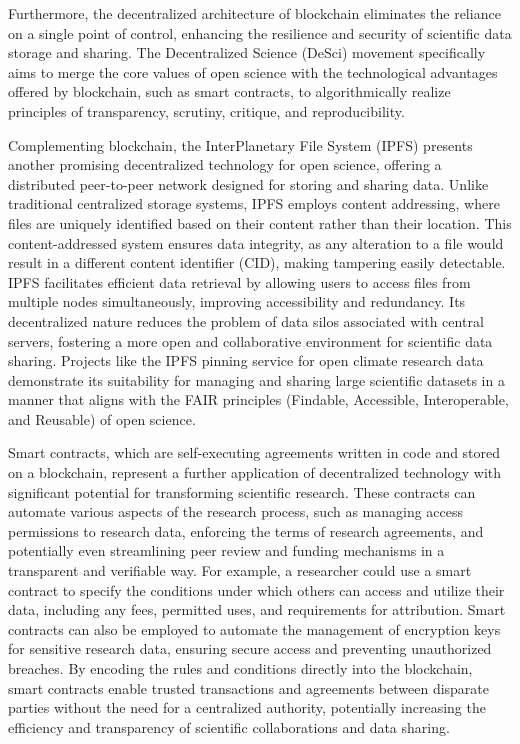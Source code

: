 \documentclass{article}
\begin{document}
Furthermore, the decentralized architecture of blockchain eliminates the reliance on a single point of control, enhancing the resilience and security of scientific data storage and sharing. The Decentralized Science (DeSci) movement specifically aims to merge the core values of open science with the technological advantages offered by blockchain, such as smart contracts, to algorithmically realize principles of transparency, scrutiny, critique, and reproducibility.

Complementing blockchain, the InterPlanetary File System (IPFS) presents another promising decentralized technology for open science, offering a distributed peer-to-peer network designed for storing and sharing data. Unlike traditional centralized storage systems, IPFS employs content addressing, where files are uniquely identified based on their content rather than their location. This content-addressed system ensures data integrity, as any alteration to a file would result in a different content identifier (CID), making tampering easily detectable. IPFS facilitates efficient data retrieval by allowing users to access files from multiple nodes simultaneously, improving accessibility and redundancy. Its decentralized nature reduces the problem of data silos associated with central servers, fostering a more open and collaborative environment for scientific data sharing. Projects like the IPFS pinning service for open climate research data demonstrate its suitability for managing and sharing large scientific datasets in a manner that aligns with the FAIR principles (Findable, Accessible, Interoperable, and Reusable) of open science.

Smart contracts, which are self-executing agreements written in code and stored on a blockchain, represent a further application of decentralized technology with significant potential for transforming scientific research. These contracts can automate various aspects of the research process, such as managing access permissions to research data, enforcing the terms of research agreements, and potentially even streamlining peer review and funding mechanisms in a transparent and verifiable way. For example, a researcher could use a smart contract to specify the conditions under which others can access and utilize their data, including any fees, permitted uses, and requirements for attribution. Smart contracts can also be employed to automate the management of encryption keys for sensitive research data, ensuring secure access and preventing unauthorized breaches. By encoding the rules and conditions directly into the blockchain, smart contracts enable trusted transactions and agreements between disparate parties without the need for a centralized authority, potentially increasing the efficiency and transparency of scientific collaborations and data sharing.
\end{document}
